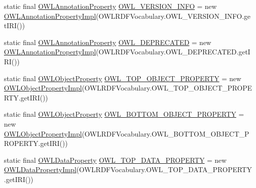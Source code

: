 \begin{DoxyCompactItemize}
\item 
static final \hyperlink{interfaceorg_1_1semanticweb_1_1owlapi_1_1model_1_1_o_w_l_annotation_property}{O\-W\-L\-Annotation\-Property} \hyperlink{classuk_1_1ac_1_1manchester_1_1cs_1_1owl_1_1owlapi_1_1_o_w_l_data_factory_impl_a9e379cc9ef0d6e459a25989786cff993}{O\-W\-L\-\_\-\-V\-E\-R\-S\-I\-O\-N\-\_\-\-I\-N\-F\-O} = new \hyperlink{classuk_1_1ac_1_1manchester_1_1cs_1_1owl_1_1owlapi_1_1_o_w_l_annotation_property_impl}{O\-W\-L\-Annotation\-Property\-Impl}(O\-W\-L\-R\-D\-F\-Vocabulary.\-O\-W\-L\-\_\-\-V\-E\-R\-S\-I\-O\-N\-\_\-\-I\-N\-F\-O.\-get\-I\-R\-I())
\item 
static final \hyperlink{interfaceorg_1_1semanticweb_1_1owlapi_1_1model_1_1_o_w_l_annotation_property}{O\-W\-L\-Annotation\-Property} \hyperlink{classuk_1_1ac_1_1manchester_1_1cs_1_1owl_1_1owlapi_1_1_o_w_l_data_factory_impl_adc3bf214d62de6c54bf24ccf09ca9842}{O\-W\-L\-\_\-\-D\-E\-P\-R\-E\-C\-A\-T\-E\-D} = new \hyperlink{classuk_1_1ac_1_1manchester_1_1cs_1_1owl_1_1owlapi_1_1_o_w_l_annotation_property_impl}{O\-W\-L\-Annotation\-Property\-Impl}(O\-W\-L\-R\-D\-F\-Vocabulary.\-O\-W\-L\-\_\-\-D\-E\-P\-R\-E\-C\-A\-T\-E\-D.\-get\-I\-R\-I())
\item 
static final \hyperlink{interfaceorg_1_1semanticweb_1_1owlapi_1_1model_1_1_o_w_l_object_property}{O\-W\-L\-Object\-Property} \hyperlink{classuk_1_1ac_1_1manchester_1_1cs_1_1owl_1_1owlapi_1_1_o_w_l_data_factory_impl_a86ed0974eaaf7dedb1f7bde3e77283f4}{O\-W\-L\-\_\-\-T\-O\-P\-\_\-\-O\-B\-J\-E\-C\-T\-\_\-\-P\-R\-O\-P\-E\-R\-T\-Y} = new \hyperlink{classuk_1_1ac_1_1manchester_1_1cs_1_1owl_1_1owlapi_1_1_o_w_l_object_property_impl}{O\-W\-L\-Object\-Property\-Impl}(O\-W\-L\-R\-D\-F\-Vocabulary.\-O\-W\-L\-\_\-\-T\-O\-P\-\_\-\-O\-B\-J\-E\-C\-T\-\_\-\-P\-R\-O\-P\-E\-R\-T\-Y.\-get\-I\-R\-I())
\item 
static final \hyperlink{interfaceorg_1_1semanticweb_1_1owlapi_1_1model_1_1_o_w_l_object_property}{O\-W\-L\-Object\-Property} \hyperlink{classuk_1_1ac_1_1manchester_1_1cs_1_1owl_1_1owlapi_1_1_o_w_l_data_factory_impl_af2e1fddd491d546de048161b5876946e}{O\-W\-L\-\_\-\-B\-O\-T\-T\-O\-M\-\_\-\-O\-B\-J\-E\-C\-T\-\_\-\-P\-R\-O\-P\-E\-R\-T\-Y} = new \hyperlink{classuk_1_1ac_1_1manchester_1_1cs_1_1owl_1_1owlapi_1_1_o_w_l_object_property_impl}{O\-W\-L\-Object\-Property\-Impl}(O\-W\-L\-R\-D\-F\-Vocabulary.\-O\-W\-L\-\_\-\-B\-O\-T\-T\-O\-M\-\_\-\-O\-B\-J\-E\-C\-T\-\_\-\-P\-R\-O\-P\-E\-R\-T\-Y.\-get\-I\-R\-I())
\item 
static final \hyperlink{interfaceorg_1_1semanticweb_1_1owlapi_1_1model_1_1_o_w_l_data_property}{O\-W\-L\-Data\-Property} \hyperlink{classuk_1_1ac_1_1manchester_1_1cs_1_1owl_1_1owlapi_1_1_o_w_l_data_factory_impl_a917996588519ed2106e2cdff883279a6}{O\-W\-L\-\_\-\-T\-O\-P\-\_\-\-D\-A\-T\-A\-\_\-\-P\-R\-O\-P\-E\-R\-T\-Y} = new \hyperlink{classuk_1_1ac_1_1manchester_1_1cs_1_1owl_1_1owlapi_1_1_o_w_l_data_property_impl}{O\-W\-L\-Data\-Property\-Impl}(O\-W\-L\-R\-D\-F\-Vocabulary.\-O\-W\-L\-\_\-\-T\-O\-P\-\_\-\-D\-A\-T\-A\-\_\-\-P\-R\-O\-P\-E\-R\-T\-Y.\-get\-I\-R\-I())

\end{DoxyCompactItemize}
